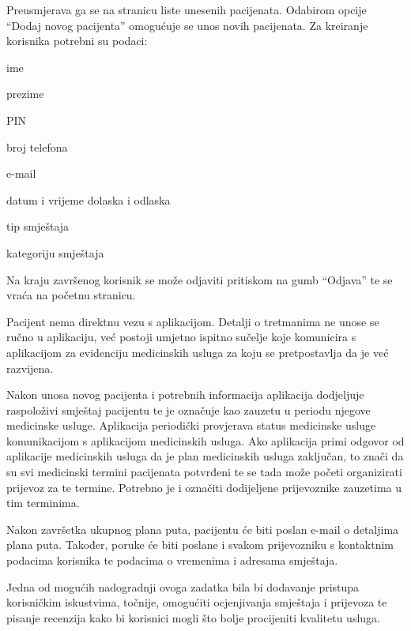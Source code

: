 		\noindent Preusmjerava ga se na stranicu liste unesenih pacijenata. Odabirom opcije “Dodaj novog pacijenta” omogućuje se unos novih pacijenata. Za kreiranje korisnika potrebni su podaci:

		\begin{packed_item}
			\item ime
			\item prezime
			\item PIN
			\item broj telefona
			\item e-mail
			\item datum i vrijeme dolaska i odlaska
			\item tip smještaja
			\item kategoriju smještaja 
		\end{packed_item}
		
		\noindent Na kraju završenog korisnik se može odjaviti pritiskom na gumb “Odjava” te se vraća na početnu stranicu. 
		
		Pacijent nema direktnu vezu s aplikacijom. Detalji o tretmanima ne unose se ručno u aplikaciju, već postoji umjetno ispitno sučelje koje komunicira s aplikacijom za evidenciju medicinskih usluga za koju se pretpostavlja da je već razvijena.  
		
		Nakon unosa novog pacijenta i potrebnih informacija aplikacija dodjeljuje raspoloživi smještaj pacijentu te je označuje kao zauzetu u periodu njegove medicinske usluge. Aplikacija periodički provjerava status medicinske usluge komunikacijom s aplikacijom medicinskih usluga. Ako aplikacija primi odgovor od aplikacije medicinskih usluga da je plan medicinskih usluga zaključan, to znači da su svi medicinski termini pacijenata potvrđeni te se tada može početi organizirati prijevoz za te termine. Potrebno je i označiti dodijeljene prijevoznike zauzetima u tim terminima. 
		
		Nakon završetka ukupnog plana puta, pacijentu će biti poslan e-mail o detaljima plana puta. Također, poruke će biti poslane i svakom prijevozniku s kontaktnim podacima korisnika te podacima o vremenima i adresama smještaja. 
		
		Jedna od mogućih nadogradnji ovoga zadatka bila bi dodavanje pristupa korisničkim iskustvima, točnije, omogućiti ocjenjivanja smještaja i prijevoza te pisanje recenzija kako bi korisnici mogli što bolje procijeniti kvalitetu usluga.  
		
		\eject
		
	
		
	